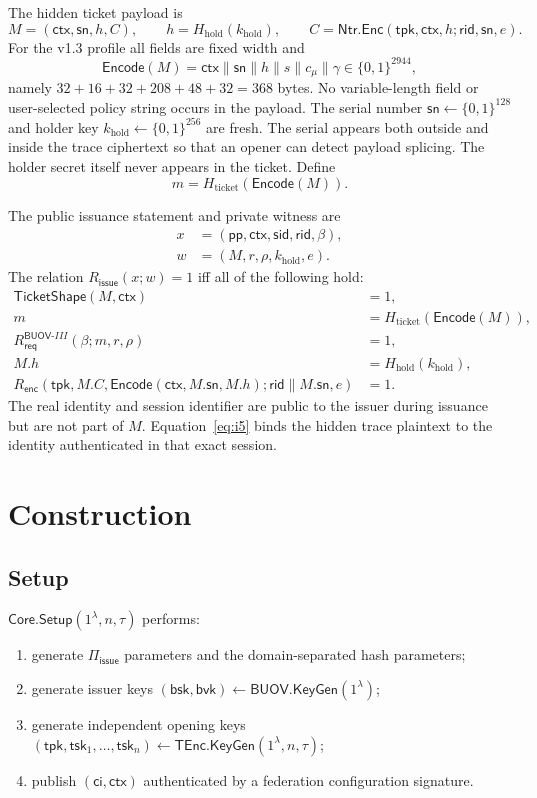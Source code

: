 \documentclass[11pt]{article}
\newcommand{\Core}{\mathsf{Core}}
\newcommand{\BUOV}{\mathsf{BUOV}}
\newcommand{\Piiss}{\Pi_{\mathsf{issue}}}
\newcommand{\TEnc}{\mathsf{TEnc}}
\newcommand{\rid}{\mathsf{rid}}
\newcommand{\sn}{\mathsf{sn}}
\newcommand{\ctx}{\mathsf{ctx}}
\newcommand{\pp}{\mathsf{pp}}
\begin{document}
The hidden ticket payload is
\[
 M=(\ctx,\sn,h,C),
 \qquad h=H_{\mathrm{hold}}(k_{\mathrm{hold}}),
 \qquad C=\mathsf{Ntr.Enc}(\mathsf{tpk},\ctx,h;\rid,\sn,e).
\]
For the v1.3 profile all fields are fixed width and
\[
 \mathsf{Encode}(M)=\ctx\|\sn\|h\|s\|c_\mu\|\gamma
 \in\{0,1\}^{2944},
\]
namely $32+16+32+208+48+32=368$ bytes.  No variable-length field or
user-selected policy string occurs in the payload.
The serial number $\sn\leftarrow\{0,1\}^{128}$ and holder key
$k_{\mathrm{hold}}\leftarrow\{0,1\}^{256}$ are fresh.  The serial appears both
outside and inside the trace ciphertext so that an opener can detect payload
splicing.  The holder secret itself never appears in the ticket.  Define
\[
  m=H_{\mathrm{ticket}}(\mathsf{Encode}(M)).
\]

The public issuance statement and private witness are
\begin{align*}
x&=(\pp,\ctx,\mathsf{sid},\rid,\beta),\\
w&=(M,r,\rho,k_{\mathrm{hold}},e).
\end{align*}
The relation $R_{\mathsf{issue}}(x;w)=1$ iff all of the following hold:
\begin{align}
 \mathsf{TicketShape}(M,\ctx)&=1, \tag{I1}\label{eq:i1}\\
 m&=H_{\mathrm{ticket}}(\mathsf{Encode}(M)), \tag{I2}\label{eq:i2}\\
 R^{\BUOV\text{-}III}_{\mathsf{req}}(\beta;m,r,\rho)&=1,
   \tag{I3}\label{eq:i3}\\
 M.h&=H_{\mathrm{hold}}(k_{\mathrm{hold}}), \tag{I4}\label{eq:i4}\\
 R_{\mathsf{enc}}(\mathsf{tpk},M.C,
   \mathsf{Encode}(\ctx,M.\sn,M.h);\rid\|M.\sn,e)&=1.
   \tag{I5}\label{eq:i5}
\end{align}
The real identity and session identifier are public to the issuer during
issuance but are not part of $M$.  Equation~\eqref{eq:i5} binds the hidden
trace plaintext to the identity authenticated in that exact session.

\section{Construction}

\subsection{Setup}

$\Core.\mathsf{Setup}(1^\lambda,n,\tau)$ performs:
\begin{enumerate}[leftmargin=*]
  \item generate $\Piiss$ parameters and the domain-separated hash parameters;
  \item generate issuer keys
  $(\mathsf{bsk},\mathsf{bvk})\leftarrow\BUOV.\mathsf{KeyGen}(1^\lambda)$;
  \item generate independent opening keys
  $(\mathsf{tpk},\mathsf{tsk}_1,\ldots,\mathsf{tsk}_n)
  \leftarrow\TEnc.\mathsf{KeyGen}(1^\lambda,n,\tau)$;
  \item publish $(\mathsf{ci},\ctx)$ authenticated by a federation
  configuration signature.
\end{enumerate}
\end{document}
